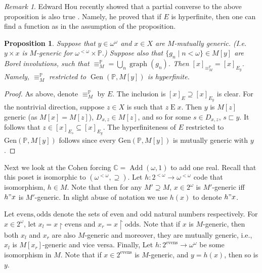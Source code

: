 \documentclass{amsart}
\newcommand{\Gen}{\operatorname{Gen}}
\DeclareMathOperator{\Add}{Add}
\DeclareMathOperator{\graph}{graph}
\newtheorem{proposition}[theorem]{Proposition}
\theoremstyle{definition}
\theoremstyle{remark}
\newtheorem{remark}[theorem]{Remark}
\begin{document}
\begin{remark}
Edward Hou recently showed that a partial converse to the above proposition is also true \cite{Hou}. Namely, he proved that if $E$ is hyperfinite, then one can find a function as in the assumption of the proposition.
\end{remark}

\begin{proposition}
Suppose that $y\in \omega^\omega$ and $x\in X$ are $M$-mutually generic. (I.e. $y\times x$ is $M$-generic for $\omega^{<\omega}\times\mathbb{P}$.) Suppose also that $\{g_n\mid n<\omega\}\in M[y]$ are Borel involutions, such that $\equiv^\mathbb{P}_M=\bigcup_n \graph(g_n)$. Then $[x]_{\equiv^\mathbb{P}_M} = [x]_{E_y}$. Namely,  $\equiv^\mathbb{P}_M$ restricted to $\Gen(\mathbb{P}, M[y])$ is hyperfinite. 
\end{proposition}
\begin{proof}
As above, denote $\equiv^\mathbb{P}_M$ by \(E\). The inclusion is $[x]_E \supseteq [x]_{E_y}$ is clear. For the nontrivial direction, suppose $z\in X$ is such that $z\mathbin{E}x$. Then $y$ is $M[z]$ generic (as $M[x]=M[z]$), $D_{x,z}\in M[z]$, and so for some $s\in D_{x,z}$, $s\sqsubset y$. It follows that $z\in[x]_{E_s}\subseteq [x]_{E_y}$. 
The hyperfiniteness of $E$ restricted to $\text{Gen}(\mathbb{P}, M[y])$ follows since every  $\text{Gen}(\mathbb{P}, M[y])$ is mutually generic with $y$.
\end{proof}  


Next we look at the Cohen forcing $\mathbb{C}=\Add(\omega, 1)$ to add one real. %
Recall that this poset is isomorphic to  $(\omega^{<\omega}, \supseteq)$. Let $h\colon 2^{<\omega}\rightarrow\omega^{<\omega}$ code that isomorphism, $h\in M$. Note that then for any $M'\supseteq M$, $x\in 2^\omega$ is $M'$-generic iff $h"x$ is $M'$-generic. In slight abuse of notation we use $h(x)$ to denote $h"x$.

Let \(\mathrm{evens}, \mathrm{odds}\) denote the sets of even and odd natural numbers respectively. For $x\in 2^\omega$, let  $x_l = x\upharpoonright \mathrm{evens}$
and  $x_r = x\upharpoonright \mathrm{odds}$.
Note that if $x$ is $M$-generic, then both $x_l$ and $x_r$ are also $M$-generic and moreover, they are mutually generic, i.e., $x_l$ is $M[x_r]$-generic and vice versa.
Finally, Let $h\colon2^{\mathrm{evens}}\to\omega^\omega$ be some isomorphism in $M$. Note that if $x\in 2^{\mathrm{evens}}$ is $M$-generic, and $y=h(x)$, then so is $y$.
\end{document}
